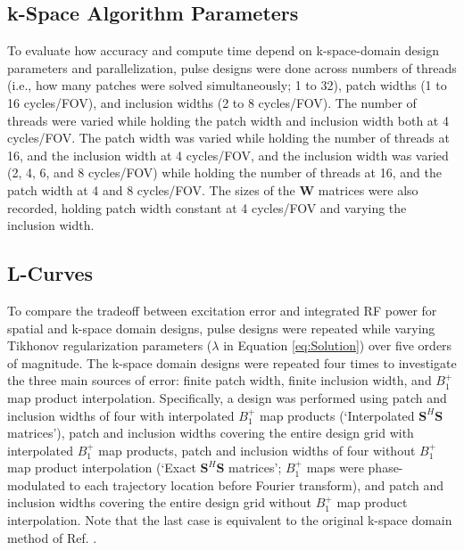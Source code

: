 \subsection*{k-Space Algorithm Parameters}
To evaluate how accuracy and compute time depend on k-space-domain design parameters and parallelization,
pulse designs were done across numbers of threads (i.e., how many patches were solved simultaneously; 1 to 32), 
patch widths (1 to 16 cycles/FOV), and inclusion widths (2 to 8 cycles/FOV). 
The number of threads were varied while holding the patch width and inclusion width both at 4 cycles/FOV.
The patch width was varied while holding the number of threads at 16, and the inclusion width at 4 cycles/FOV,
and the inclusion width was varied (2, 4, 6, and 8 cycles/FOV) while holding the number of threads at 16, and the patch width at 4 and 8 cycles/FOV. 
The sizes of the $\bm{W}$ matrices were also recorded, holding patch width constant at 4 cycles/FOV and varying the inclusion width. 

\subsection*{L-Curves}
To compare the tradeoff between excitation error and integrated RF power for spatial and k-space domain designs,
pulse designs were repeated while varying Tikhonov regularization parameters ($\lambda$ in Equation \ref{eq:Solution}) 
over five orders of magnitude. 
The k-space domain designs were repeated four times to investigate the three main sources of error:
finite patch width, finite inclusion width, and $B_1^+$ map product interpolation. 
Specifically, a design was performed using patch and inclusion widths of four
with interpolated $B_1^+$ map products (`Interpolated $\bm{S}^H\bm{S}$ matrices'),
patch and inclusion widths covering the entire design grid with interpolated $B_1^+$ map products,
patch and inclusion widths of four without $B_1^+$ map product interpolation (`Exact $\bm{S}^H\bm{S}$ matrices'; 
$B_1^+$ maps were phase-modulated to each trajectory location before Fourier transform),
and patch and inclusion widths covering the entire design grid without $B_1^+$ map product interpolation. 
Note that the last case is equivalent to the original k-space domain method of Ref. \cite{Katscher:2003:Magn-Reson-Med:12509830}.

